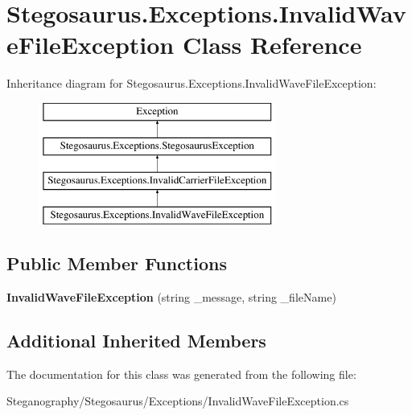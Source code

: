 \hypertarget{class_stegosaurus_1_1_exceptions_1_1_invalid_wave_file_exception}{}\section{Stegosaurus.\+Exceptions.\+Invalid\+Wave\+File\+Exception Class Reference}
\label{class_stegosaurus_1_1_exceptions_1_1_invalid_wave_file_exception}
Inheritance diagram for Stegosaurus.\+Exceptions.\+Invalid\+Wave\+File\+Exception\+:\begin{figure}[H]
\begin{center}
\leavevmode
\includegraphics[height=4.000000cm]{class_stegosaurus_1_1_exceptions_1_1_invalid_wave_file_exception}
\end{center}
\end{figure}
\subsection*{Public Member Functions}
\begin{DoxyCompactItemize}
\item 
{\bfseries Invalid\+Wave\+File\+Exception} (string \+\_\+message, string \+\_\+file\+Name)\hypertarget{class_stegosaurus_1_1_exceptions_1_1_invalid_wave_file_exception_a845814b58b45eba6c3b7fcb7da160fd5}{}\label{class_stegosaurus_1_1_exceptions_1_1_invalid_wave_file_exception_a845814b58b45eba6c3b7fcb7da160fd5}

\end{DoxyCompactItemize}
\subsection*{Additional Inherited Members}


The documentation for this class was generated from the following file\+:\begin{DoxyCompactItemize}
\item 
Steganography/\+Stegosaurus/\+Exceptions/Invalid\+Wave\+File\+Exception.\+cs\end{DoxyCompactItemize}
